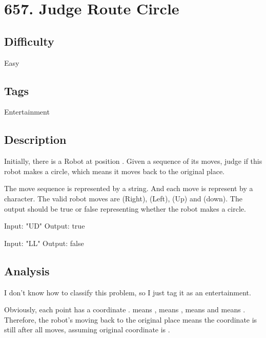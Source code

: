 \tocless\section{657. Judge Route Circle}
\label{algo:657}

\subsection*{Difficulty}
Easy

\subsection*{Tags}
Entertainment

\subsection*{Description}
Initially, there is a Robot at position . Given a sequence of its moves, judge if this robot makes a circle, which means it moves back to the original place.

The move sequence is represented by a string. And each move is represent by a character. The valid robot moves are  (Right),  (Left),  (Up) and  (down). The output should be true or false representing whether the robot makes a circle.

\begin{example}
\begin{multilinecode}
Input: "UD"
Output: true
\end{multilinecode}
\end{example}

\begin{example}
\begin{multilinecode}
Input: "LL"
Output: false
\end{multilinecode}
\end{example}

\subsection*{Analysis}
I don't know how to classify this problem, so I just tag it as an entertainment.

Obviously, each point has a coordinate .  means ,  means ,  means  and  means . Therefore, the robot's moving back to the original place means the coordinate is still  after all moves, assuming original coordinate is .

